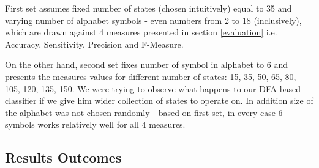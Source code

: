 \documentclass{mini}
\begin{document}
First set assumes fixed number of states (chosen intuitively) equal to 35 and varying number of alphabet symbols - even numbers from 2 to 18 (inclusively), which are drawn against 4 measures presented in section \ref{evaluation} i.e. Accuracy, Sensitivity, Precision and F-Measure. 

On the other hand, second set fixes number of symbol in alphabet to 6 and presents the measures values for different number of states: 15, 35, 50, 65, 80, 105, 120, 135, 150. We were trying to observe what happens to our DFA-based classifier if we give him wider collection of states to operate on. In addition size of the alphabet was not chosen randomly - based on first set, in every case 6 symbols works relatively well for all 4 measures.

\subsection{Results Outcomes}
\end{document}
